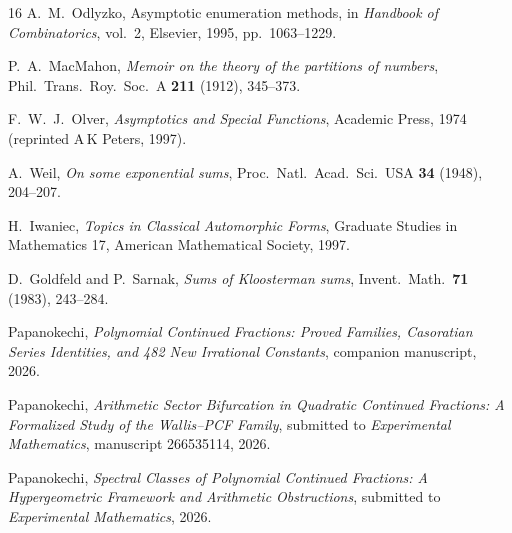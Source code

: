 \documentclass[11pt,a4paper]{article}
\begin{document}
\begin{thebibliography}{16}
A.~M.~Odlyzko,
Asymptotic enumeration methods, in
\emph{Handbook of Combinatorics}, vol.~2, Elsevier, 1995, pp.~1063--1229.

P.~A.~MacMahon,
\textit{Memoir on the theory of the partitions of numbers},
Phil.\ Trans.\ Roy.\ Soc.\ A \textbf{211} (1912), 345--373.

F.~W.~J.~Olver,
\emph{Asymptotics and Special Functions},
Academic Press, 1974 (reprinted A\,K Peters, 1997).

A.~Weil,
\textit{On some exponential sums},
Proc.\ Natl.\ Acad.\ Sci.\ USA \textbf{34} (1948), 204--207.

H.~Iwaniec,
\emph{Topics in Classical Automorphic Forms},
Graduate Studies in Mathematics 17, American Mathematical Society, 1997.

D.~Goldfeld and P.~Sarnak,
\textit{Sums of Kloosterman sums},
Invent.\ Math.\ \textbf{71} (1983), 243--284.

Papanokechi,
\textit{Polynomial Continued Fractions: Proved Families, Casoratian Series Identities, and 482 New Irrational Constants},
companion manuscript, 2026.

Papanokechi,
\textit{Arithmetic Sector Bifurcation in Quadratic Continued Fractions: A Formalized Study of the Wallis--PCF Family},
submitted to \emph{Experimental Mathematics}, manuscript 266535114, 2026.

Papanokechi,
\textit{Spectral Classes of Polynomial Continued Fractions: A Hypergeometric Framework and Arithmetic Obstructions},
submitted to \emph{Experimental Mathematics}, 2026.

\end{thebibliography}
\end{document}
